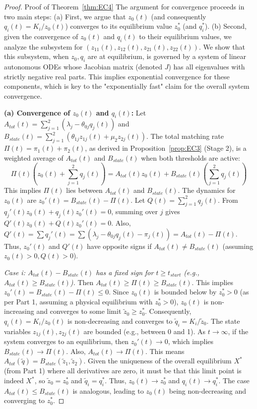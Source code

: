 \begin{proof}{Proof of Theorem~\ref{thm:EC4}}
The argument for convergence proceeds in two main steps:
(a) First, we argue that $z_0(t)$ (and consequently $q_i(t)=K_i/z_0(t)$) converges to its equilibrium value $z_0^*$ (and $q_i^*$).
(b) Second, given the convergence of $z_0(t)$ and $q_i(t)$ to their equilibrium values, we analyze the subsystem for $(z_{11}(t), z_{12}(t), z_{21}(t), z_{22}(t))$. We show that this subsystem, when $z_0, q_i$ are at equilibrium, is governed by a system of linear autonomous ODEs whose Jacobian matrix (denoted $J$) has all eigenvalues with strictly negative real parts. This implies exponential convergence for these components, which is key to the "exponentially fast" claim for the overall system convergence.

\textbf{(a) Convergence of $z_0(t)$ and $q_i(t)$:}
Let $A_{tot}(t) = \sum_{j=1}^{2} (\lambda_j - \theta_{0j}q_j(t))$ and 
$B_{state}(t) = \sum_{j=1}^{2}(\theta_{1j}z_{1j}(t) + \mu_2z_{2j}(t))$. 
The total matching rate $\Pi(t) = \pi_1(t)+\pi_2(t)$, as derived in Proposition~\ref{prop:EC3} (Stage 2), 
is a weighted average of $A_{tot}(t)$ and $B_{state}(t)$ when both thresholds are active:
\begin{equation*}
  \Pi(t)(z_0(t) + \sum_{j=1}^{2} q_j(t)) = A_{tot}(t)z_0(t) + B_{state}(t)(\sum_{j=1}^{2} q_j(t))
\end{equation*}
This implies $\Pi(t)$ lies between $A_{tot}(t)$ and $B_{state}(t)$.
The dynamics for $z_0(t)$ are $z_0'(t) = B_{state}(t) - \Pi(t)$.
Let $Q(t) = \sum_{j=1}^{2} q_j(t)$. From $q_j'(t)z_0(t) + q_j(t)z_0'(t) = 0$, 
summing over $j$ gives $Q'(t)z_0(t) + Q(t)z_0'(t) = 0$.
Also, $Q'(t) = \sum q_j'(t) = \sum (\lambda_j - \theta_{0j}q_j(t) - \pi_j(t)) = A_{tot}(t) - \Pi(t)$.
Thus, $z_0'(t)$ and $Q'(t)$ have opposite signs if $A_{tot}(t) \neq B_{state}(t)$ (assuming $z_0(t)>0, Q(t)>0$).

   \textit{Case i: $A_{tot}(t) - B_{state}(t)$ has a fixed sign for $t \ge t_{start}$ (e.g., $A_{tot}(t) \ge B_{state}(t)$).}
       Then $A_{tot}(t) \ge \Pi(t) \ge B_{state}(t)$. This implies $z_0'(t) = B_{state}(t) - \Pi(t) \le 0$. 
       Since $z_0(t)$ is bounded below by $z_0^* > 0$ (as per Part 1, assuming a physical equilibrium 
       with $z_0^*>0$), $z_0(t)$ is non-increasing and converges to some limit $\tilde{z}_0 \ge z_0^*$. 
       Consequently, $q_i(t) = K_i/z_0(t)$ is non-decreasing and converges to $\tilde{q}_i = K_i/\tilde{z}_0$.
       The state variables $z_{1j}(t), z_{2j}(t)$ are bounded (e.g., between 0 and 1). As $t \to \infty$, 
       if the system converges to an equilibrium, then $z_0'(t) \to 0$, 
       which implies $B_{state}(t) \to \Pi(t)$. Also, $A_{tot}(t) \to \Pi(t)$. 
       This means $A_{tot}(\tilde{q}) = B_{state}(\tilde{z}_{1},\tilde{z}_{2})$. 
       Given the uniqueness of the overall equilibrium $X^*$ (from Part 1) where all derivatives are zero, it must be that this limit point is indeed $X^*$, so $\tilde{z}_0 = z_0^*$ and $\tilde{q}_i = q_i^*$.
       Thus, $z_0(t) \to z_0^*$ and $q_i(t) \to q_i^*$.
       The case $A_{tot}(t) \le B_{state}(t)$ is analogous, leading to $z_0(t)$ being non-decreasing and converging to $z_0^*$.


\end{proof}
